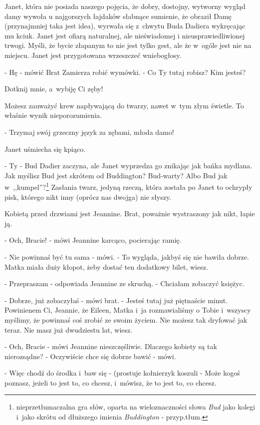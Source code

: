 \documentclass[oneside,polish,12pt,sfheadings]{mwbk}
\begin{document}
Janet, która nie posiada naszego pojęcia, że dobry, dostojny, wytworny
wygląd damy wywoła u najgorszych łajdaków słabnące sumienie, że obraził
Damę (przynajmniej taka jest idea), wyrwała się z~chwytu Buda Dadiera
wykręcając mu kciuk. Janet jest ofiarą naturalnej, ale nieświadomej
i nieusprawiedliwionej trwogi. Myśli, że bycie złapanym to nie jest
tylko gest, ale że w~ogóle jest nie na miejscu. Janet jest przygotowana
wrzeszczeć wniebogłosy.

- Hę - mówić Brat Zamierza robić wymówki. - Co Ty tutaj robisz? Kim
jesteś?

Dotknij mnie, a~wybiję Ci zęby!

Możesz zauważyć krew napływającą do twarzy, nawet w~tym złym świetle.
To właśnie wynik nieporozumienia. 

- Trzymaj swój grzeczny język za zębami, młoda damo!

Janet uśmiecha się kpiąco.

- Ty - Bud Dadier zaczyna, ale Janet wyprzedza go znikając jak bańka
mydlana. Jak myślisz Bud jest skrótem od Buddington? Bud-warty? Albo
Bud jak w~,,kumpel''?\footnote{nieprzetłumaczalna gra słów, oparta na
wieloznaczności słowa \textit{Bud} jako kolegi i~jako skrótu od dłuższego imienia \textit{Buddington} - przyp.tłum.} 
Zasłania twarz, jedyną rzeczą, która została po Janet to ochrypły
pisk, którego nikt inny (oprócz nas dwojga) nie słyszy.

Kobietą przed drzwiami jest Jeannine. Brat, poważnie wystraszony jak
nikt, łapie ją.

- Och, Bracie! - mówi Jeannine karcąco, pocierając ramię.

- Nie powinnaś być tu sama - mówi. - To wygląda, jakbyś się nie bawiła
dobrze. Matka miała duży kłopot, żeby dostać ten dodatkowy bilet,
wiesz.

- Przepraszam - odpowiada Jeannine ze skruchą. - Chciałam zobaczyć
księżyc.

- Dobrze, już zobaczyłaś - mówi brat. - Jesteś tutaj już piętnaście
minut. Powinienem Ci, Jeannie, że Eileen, Matka i~ja rozmawialiśmy
o Tobie i~wszyscy myślimy, że powinnaś coś zrobić ze swoim życiem.
Nie możesz tak dryfować jak teraz. Nie masz już dwudziestu lat, wiesz.

- Och, Bracie - mówi Jeannine nieszczęśliwie. Dlaczego kobiety są
tak nierozsądne? - Oczywiście chce się dobrze bawić - mówi.

- Więc chodź do środka i~baw się - (prostuje kołnierzyk koszuli -
Może kogoś poznasz, jeżeli to jest to, co chcesz, i~mówisz, że to
jest to, co chcesz.
\end{document}
